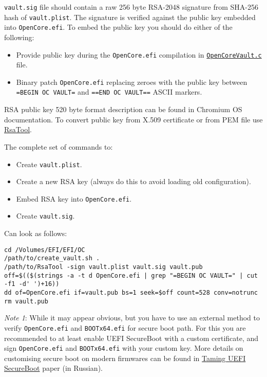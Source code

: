 \documentclass[]{article}
\providecommand{\tightlist}{%
  \setlength{\itemsep}{0pt}\setlength{\parskip}{0pt}}
\begin{document}
\begin{enumerate}
  \texttt{vault.sig} file should contain a raw 256 byte RSA-2048 signature from SHA-256
  hash of \texttt{vault.plist}. The signature is verified against the public
  key embedded into \texttt{OpenCore.efi}. To embed the public key you should
  do either of the following:

  \begin{itemize}
  \tightlist
  \item Provide public key during the \texttt{OpenCore.efi} compilation in
  \href{https://github.com/acidanthera/OpenCorePkg/blob/master/Platform/OpenCore/OpenCoreVault.c}{\texttt{OpenCoreVault.c}} file.
  \item Binary patch \texttt{OpenCore.efi} replacing zeroes with the public key
  between \texttt{=BEGIN OC VAULT=} and \texttt{==END OC VAULT==} ASCII markers.
  \end{itemize}

  RSA public key 520 byte format description can be found in Chromium OS documentation.
  To convert public key from X.509 certificate or from PEM file use
  \href{https://github.com/acidanthera/OpenCorePkg/tree/master/Utilities/CreateVault}{RsaTool}.


  The complete set of commands to:

  \begin{itemize}
  \tightlist
  \item Create \texttt{vault.plist}.
  \item Create a new RSA key (always do this to avoid loading old configuration).
  \item Embed RSA key into \texttt{OpenCore.efi}.
  \item Create \texttt{vault.sig}.
  \end{itemize}

  Can look as follows:
\begin{lstlisting}[label=createvault, style=ocbash]
cd /Volumes/EFI/EFI/OC
/path/to/create_vault.sh .
/path/to/RsaTool -sign vault.plist vault.sig vault.pub
off=$(($(strings -a -t d OpenCore.efi | grep "=BEGIN OC VAULT=" | cut -f1 -d' ')+16))
dd of=OpenCore.efi if=vault.pub bs=1 seek=$off count=528 conv=notrunc
rm vault.pub
\end{lstlisting}

  \emph{Note 1}: While it may appear obvious, but you have to use an external
  method to verify \texttt{OpenCore.efi} and \texttt{BOOTx64.efi} for
  secure boot path. For this you are recommended to at least enable UEFI SecureBoot
  with a custom certificate, and sign \texttt{OpenCore.efi} and \texttt{BOOTx64.efi}
  with your custom key. More details on customising secure boot on modern firmwares
  can be found in \href{https://habr.com/post/273497/}{Taming UEFI SecureBoot}
  paper (in Russian).


\end{enumerate}
\end{document}
